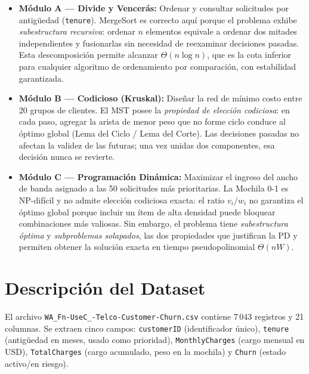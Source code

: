 \documentclass[11pt, a4paper]{article}
\begin{document}
\begin{itemize}
  \item \textbf{Módulo A --- Divide y Vencerás:} Ordenar y consultar solicitudes por
        antigüedad (\texttt{tenure}). MergeSort es correcto aquí porque el problema exhibe
        \textit{subestructura recursiva}: ordenar $n$ elementos equivale a ordenar dos
        mitades independientes y fusionarlas sin necesidad de reexaminar decisiones pasadas.
        Esta descomposición permite alcanzar $\Theta(n\log n)$, que es la cota inferior
        para cualquier algoritmo de ordenamiento por comparación, con estabilidad garantizada.

  \item \textbf{Módulo B --- Codicioso (Kruskal):} Diseñar la red de mínimo costo entre
        20 grupos de clientes. El MST posee la \textit{propiedad de elección codiciosa}:
        en cada paso, agregar la arista de menor peso que no forme ciclo conduce al óptimo
        global (Lema del Ciclo / Lema del Corte). Las decisiones pasadas no afectan la
        validez de las futuras; una vez unidas dos componentes, esa decisión nunca se revierte.

  \item \textbf{Módulo C --- Programación Dinámica:} Maximizar el ingreso del ancho de
        banda asignado a las 50 solicitudes más prioritarias. La Mochila 0-1 es NP-difícil
        y no admite elección codiciosa exacta: el ratio $v_i/w_i$ no garantiza el óptimo
        global porque incluir un ítem de alta densidad puede bloquear combinaciones más
        valiosas. Sin embargo, el problema tiene \textit{subestructura óptima} y
        \textit{subproblemas solapados}, las dos propiedades que justifican la PD y
        permiten obtener la solución exacta en tiempo pseudopolinomial $\Theta(nW)$.
\end{itemize}

\section{Descripción del Dataset}

El archivo \texttt{WA\_Fn-UseC\_-Telco-Customer-Churn.csv} contiene 7\,043 registros y
21 columnas. Se extraen cinco campos: \texttt{customerID} (identificador único),
\texttt{tenure} (antigüedad en meses, usado como prioridad), \texttt{MonthlyCharges}
(cargo mensual en USD), \texttt{TotalCharges} (cargo acumulado, peso en la mochila) y
\texttt{Churn} (estado activo/en riesgo).
\end{document}
